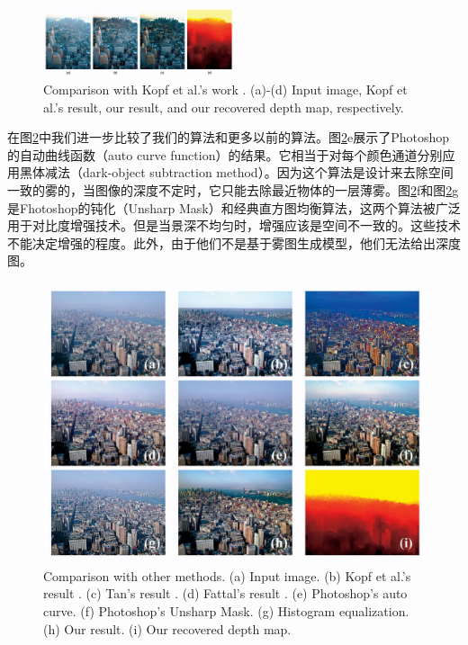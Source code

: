 \documentclass{ctexart}
\begin{document}
\begin{figure}[tbp]
	\centering
	\includegraphics[width=0.5\textwidth]{img/16.jpg}
	\caption{Comparison with Kopf et al.’s work \cite{KopfNeubertChenCohenCohenOrDeussenUyttendaeleLischinski2008}. (a)-(d) Input image, Kopf et al.’s result, our result, and our recovered depth map, respectively.}\label{fig:16}
\end{figure}

在图\ref{fig:17}中我们进一步比较了我们的算法和更多以前的算法。图\ref{fig:17}e展示了Photoshop的自动曲线函数（auto curve function）的结果。它相当于对每个颜色通道分别应用黑体减法（dark-object subtraction method）\cite{Chavez1988}。因为这个算法是设计来去除空间一致的雾的，当图像的深度不定时，它只能去除最近物体的一层薄雾。图\ref{fig:17}f和图\ref{fig:17}g是Fhotoshop的钝化（Unsharp Mask）和经典直方图均衡算法，这两个算法被广泛用于对比度增强技术。但是当景深不均匀时，增强应该是空间不一致的。这些技术不能决定增强的程度。此外，由于他们不是基于雾图生成模型，他们无法给出深度图。\par

\begin{figure}[tbp]
	\centering
	\includegraphics[width=\textwidth]{img/17.jpg}
	\caption{Comparison with other methods. (a) Input image. (b) Kopf et al.’s result \cite{KopfNeubertChenCohenCohenOrDeussenUyttendaeleLischinski2008}. (c) Tan’s result \cite{Tan2008}. (d) Fattal’s result \cite{Fattal2008}. (e) Photoshop’s auto curve. (f) Photoshop’s Unsharp Mask. (g) Histogram equalization. (h) Our result. (i) Our recovered depth map.}\label{fig:17}
\end{figure}
\end{document}
